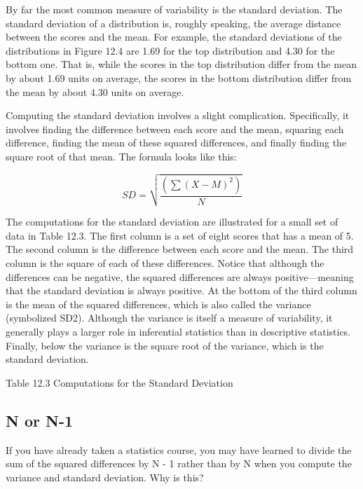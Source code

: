 By far the most common measure of variability is the standard deviation. The standard deviation of a distribution is, roughly speaking, the average distance between the scores and the mean. For example, the standard deviations of the distributions in Figure 12.4 are 1.69 for the top distribution and 4.30 for the bottom one. That is, while the scores in the top distribution differ from the mean by about 1.69 units on average, the scores in the bottom distribution differ from the mean by about 4.30 units on average.

Computing the standard deviation involves a slight complication. Specifically, it involves finding the difference between each score and the mean, squaring each difference, finding the mean of these squared differences, and finally finding the square root of that mean. The formula looks like this:


\begin{equation}
SD=\sqrt{\frac{(\sum(X-M)^2)}{N}}
\end{equation}

The computations for the standard deviation are illustrated for a small set of data in Table 12.3. The first column is a set of eight scores that has a mean of 5. The second column is the difference between each score and the mean. The third column is the square of each of these differences. Notice that although the differences can be negative, the squared differences are always positive---meaning that the standard deviation is always positive. At the bottom of the third column is the mean of the squared differences, which is also called the variance (symbolized SD2). Although the variance is itself a measure of variability, it generally plays a larger role in inferential statistics than in descriptive statistics. Finally, below the variance is the square root of the variance, which is the standard deviation.

Table 12.3 Computations for the Standard Deviation
   
\subsection{N or N-1}

If you have already taken a statistics course, you may have learned to divide the sum of the squared differences by N - 1 rather than by N when you compute the variance and standard deviation. Why is this?

